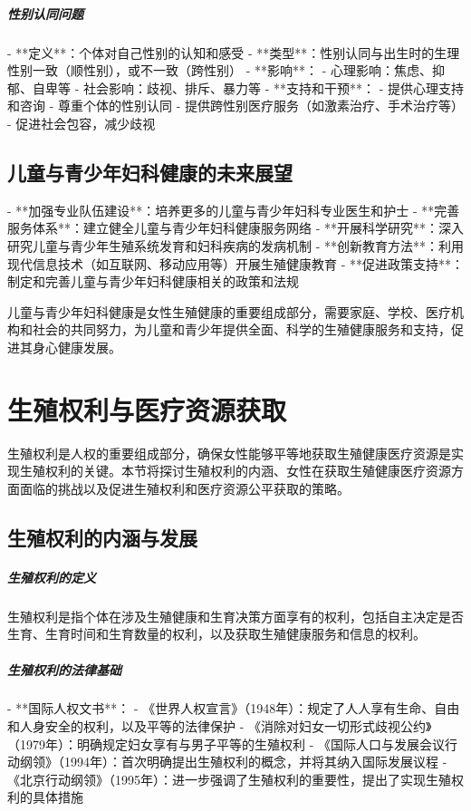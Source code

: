 \begin{enumerate}
\subparagraph{性别认同问题}

- **定义**：个体对自己性别的认知和感受
- **类型**：性别认同与出生时的生理性别一致（顺性别），或不一致（跨性别）
- **影响**：
  - 心理影响：焦虑、抑郁、自卑等
  - 社会影响：歧视、排斥、暴力等
- **支持和干预**：
  - 提供心理支持和咨询
  - 尊重个体的性别认同
  - 提供跨性别医疗服务（如激素治疗、手术治疗等）
  - 促进社会包容，减少歧视

\subsection{儿童与青少年妇科健康的未来展望}

- **加强专业队伍建设**：培养更多的儿童与青少年妇科专业医生和护士
- **完善服务体系**：建立健全儿童与青少年妇科健康服务网络
- **开展科学研究**：深入研究儿童与青少年生殖系统发育和妇科疾病的发病机制
- **创新教育方法**：利用现代信息技术（如互联网、移动应用等）开展生殖健康教育
- **促进政策支持**：制定和完善儿童与青少年妇科健康相关的政策和法规

儿童与青少年妇科健康是女性生殖健康的重要组成部分，需要家庭、学校、医疗机构和社会的共同努力，为儿童和青少年提供全面、科学的生殖健康服务和支持，促进其身心健康发展。

\section{生殖权利与医疗资源获取}

生殖权利是人权的重要组成部分，确保女性能够平等地获取生殖健康医疗资源是实现生殖权利的关键。本节将探讨生殖权利的内涵、女性在获取生殖健康医疗资源方面面临的挑战以及促进生殖权利和医疗资源公平获取的策略。

\subsection{生殖权利的内涵与发展}

\subparagraph{生殖权利的定义}
生殖权利是指个体在涉及生殖健康和生育决策方面享有的权利，包括自主决定是否生育、生育时间和生育数量的权利，以及获取生殖健康服务和信息的权利。

\subparagraph{生殖权利的法律基础}

- **国际人权文书**：
  - 《世界人权宣言》（1948年）：规定了人人享有生命、自由和人身安全的权利，以及平等的法律保护
  - 《消除对妇女一切形式歧视公约》（1979年）：明确规定妇女享有与男子平等的生殖权利
  - 《国际人口与发展会议行动纲领》（1994年）：首次明确提出生殖权利的概念，并将其纳入国际发展议程
  - 《北京行动纲领》（1995年）：进一步强调了生殖权利的重要性，提出了实现生殖权利的具体措施


\end{enumerate}
